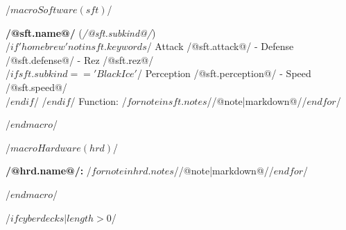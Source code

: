 /$ macro Software(sft) $/
\begin{minipage}{\columnwidth}
\noindent \textbf{ /@sft.name@/ }(\textit{/@sft.subkind@/})\\
/$ if 'homebrew' not in sft.keywords$/
Attack /@sft.attack@/ - Defense /@sft.defense@/ - Rez /@sft.rez@/\\
/$ if sft.subkind == 'Black Ice' $/
Perception /@sft.perception@/ - Speed /@sft.speed@/\\
/$endif$/
/$endif$/
Function: /$for note in sft.notes $//@note|markdown@//$endfor$/
\end{minipage}
/$ endmacro $/

/$ macro Hardware(hrd) $/
\begin{minipage}{\columnwidth}
\noindent \textbf{ /@hrd.name@/: } /$for note in hrd.notes $//@note|markdown@//$endfor$/
\end{minipage}
/$ endmacro $/

/$ if cyberdecks|length > 0 $/

